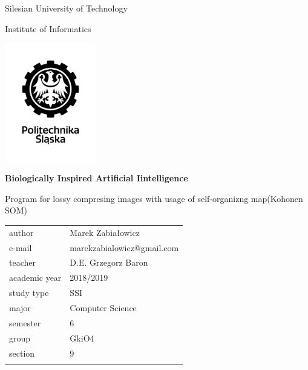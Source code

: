\documentclass[12pt,a4paper]{article}
\begin{document}
\frenchspacing
\thispagestyle{empty}
\begin{center}
{\Large\sf Silesian University of Technology   %

Institute of Informatics

}

\vfill

\includegraphics[width=0.30\textwidth]{images/polsl}

\vfill\vfill

{\Huge\sffamily\bfseries Biologically Inspired Artificial Iintelligence} \\ %

\vfill\vfill

{\LARGE\sf Program for lossy compresing images with usage of self-organizng map(Kohonen SOM)}  %


\vfill \vfill\vfill\vfill



\begin{tabular}{ll}
\toprule
	author                 						   & Marek Żabiałowicz         	\\	
	e-mail                 						   & marekzabialowicz@gmail.com        	\\	
	teacher                                             & D.E. Grzegorz Baron			\\
	academic year                                         & 2018/2019					 \\
	study type                                         & SSI					 \\
	major                                               & Computer Science             \\
	semester                                                & 6                           \\
	group                                                  & GkiO4                        \\
	section                                                 & 9                           \\  
\bottomrule &  \\
\end{tabular}

\end{center}
\cleardoublepage
\end{document}
